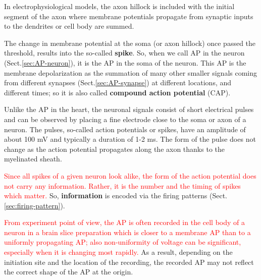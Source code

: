 In electrophysiological models, the axon hillock is included with the initial
segment of the axon where membrane potentials propagate from synaptic inputs to
the dendrites or cell body are summed.

The change in membrane potential at the soma (or axon hillock) once passed the
threshold, results into the so-called {\bf spike}. So, when we
call AP in the neuron (Sect.\ref{sec:AP-neuron}), it is the AP in the soma of the neuron. This
AP is the membrane depolarization as the summation of many other smaller signals
coming from different synapses (Sect.\ref{sec:AP-synapse}) at different
locations, and different times; so it is also called {\bf compound action
potential} (CAP).

Unlike the AP in the heart, the neuronal signals consist of short electrical
pulses and can be observed by placing a fine electrode close to the soma or axon
of a neuron. The pulses, so-called action potentials or spikes, have an
amplitude of about 100 mV and typically a duration of 1-2 ms. The form of the
pulse does not change as the action potential propagates along the axon thanks
to the myelinated sheath.

\textcolor{red}{Since all spikes of a given neuron look alike, the form of the
action potential does not carry any information.
Rather, it is the number and the timing of spikes which matter.}
So, {\bf information} is encoded via the firing patterns
(Sect.\ref{sec:firing-pattern}).

\begin{mdframed}

\textcolor{red}{From experiment point of view, the AP is often recorded in the
cell body of a neuron in a brain slice preparation which is closer to a membrane
AP than to a uniformly propagating AP; also non-uniformity of voltage can be
significant, especially when it is changing most rapidly.} As a result,
depending on the initiation site and the location of the recording, the recorded
AP may not reflect the correct shape of the AP at the origin.

\end{mdframed}


